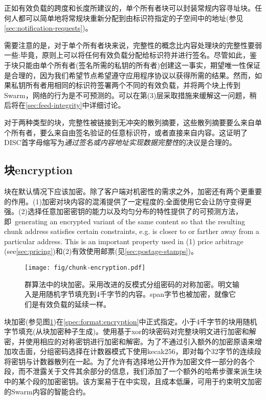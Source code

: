 正如有效负载的跨度和长度所建议的，单个所有者块可以封装常规内容寻址块。任何人都可以简单地将常规块重新分配到由标识符指定的子空间中的地址(参见\ref{sec:notification-requests})。


需要注意的是，对于单个所有者块来说，完整性的概念比内容处理块的完整性要弱一些:毕竟，原则上可以将任何有效负载分配给标识符并进行签名。尽管如此，鉴于块只能由单个所有者(签名所需的私钥的所有者)创建这一事实，期望唯一性保证是合理的，因为我们希望节点希望遵守应用程序协议以获得所需的结果。然而，如果私钥所有者用相同的标识符签署两个不同的有效负载，并将两个块上传到Swarm，网络的行为是不可预测的。可以在第(3)层采取措施来缓解这一问题，稍后将在\ref{sec:feed-integrity}中详细讨论。

对于两种类型的块，完整性被链接到无冲突的散列摘要，这些散列摘要要么来自单个所有者，要么来自由签名验证的任意标识符，或者直接来自内容。这证明了DISC首字母缩写为\emph{通过签名或内容地址实现数据完整性}的决议是合理的。

\subsection{块encryption\statusgreen}\label{sec:chunk-encryption}

块在默认情况下应该加密。除了客户端对机密性的需求之外，加密还有两个更重要的作用。(1)加密对块内容的混淆提供了一定程度的;全面使用它会让防守变得更强。(2)选择任意加密密钥的能力以及均匀分布的特性提供了的可预测方法，即\ generating an encrypted variant of the same content so that the resulting chunk address satisfies certain constraints, e.g. is closer to or farther away from a particular address. This is an important property used in (1) price arbitrage (see\ref{sec:pricing})和(2)有效使用邮票(见\ref{sec:postage-stamps})。


\begin{figure}[htbp]
    \centering
    \texttt{[image: fig/chunk-encryption.pdf]}
    \caption[群中的块加密\statusgreen]{群算法中的块加密。采用改进的反模式分组密码的对称加密。明文输入是用随机字节填充到4千字节的内容。span字节也被加密，就像它们是有效负载的延续一样。}
    \label{fig:chunk-encryption}
\end{figure}


块加密(参见图\ref{fig:chunk-encryption})在\ref{spec:format:encryption}中正式指定。小于4千字节的块用随机字节填充(从块加密种子生成)。使用基于xor的块密码对完整块明文进行加密和解密，并使用相应的对称密钥进行加密和解密。为了不通过引入额外的加密原语来增加攻击面，分组密码选择在计数器模式下使用kecak256，即对每个32字节的连续段将密钥与计数器散列在一起。为了允许有选择地公开作为加密文件一部分的各个段，而不泄露关于文件其余部分的信息，我们添加了一个额外的哈希步骤来派生块中的某个段的加密密钥。该方案易于在中实现，且成本低廉，可用于约束明文加密的Swarm内容的智能合约。

